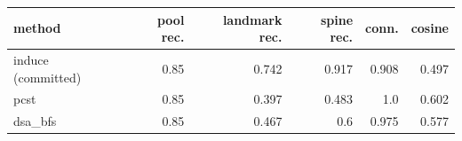 \begin{tabular}{lrrrrr}
\toprule
method & pool rec. & landmark rec. & spine rec. & conn. & cosine \\
\midrule
induce (committed) & 0.85 & 0.742 & 0.917 & 0.908 & 0.497 \\
pcst & 0.85 & 0.397 & 0.483 & 1.0 & 0.602 \\
dsa\_bfs & 0.85 & 0.467 & 0.6 & 0.975 & 0.577 \\
\bottomrule
\end{tabular}
